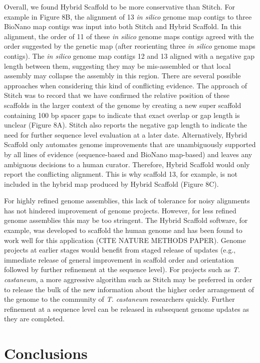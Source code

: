 \documentclass{bmcart}
\begin{document}
Overall, we found Hybrid Scaffold to be more conservative than Stitch. For example in Figure 8B, the alignment of 13 \textit{in silico} genome map contigs to three BioNano map contigs was input into both Stitch and Hybrid Scaffold. In this alignment, the order of 11 of these \textit{in silico} genome maps contigs agreed with the order suggested by the genetic map (after reorienting three \textit{in silico} genome maps contigs). The \textit{in silico} genome map contigs 12 and 13 aligned with a negative gap length between them, suggesting they may be mis-assembled or that local assembly may collapse the assembly in this region. There are several possible approaches when considering this kind of conflicting evidence. The approach of Stitch was to record that we have confirmed the relative position of these scaffolds in the larger context of the genome by creating a new super scaffold containing 100 bp spacer gaps to indicate that exact overlap or gap length is unclear (Figure 8A). Stitch also reports the negative gap length to indicate the need for further sequence level evaluation at a later date. Alternatively, Hybrid Scaffold only automates genome improvements that are unambiguously supported by all lines of evidence (sequence-based and BioNano map-based) and leaves any ambiguous decisions to a human curator. Therefore, Hybrid Scaffold would only report the conflicting alignment. This is why scaffold 13, for example, is not included in the hybrid map produced by Hybrid Scaffold (Figure 8C). 

For highly refined genome assemblies, this lack of tolerance for noisy alignments has not hindered improvement of genome projects. However, for less refined genome assemblies this may be too stringent. The Hybrid Scaffold software, for example, was developed to scaffold the human genome and has been found to work well for this application (CITE NATURE METHODS PAPER). Genome projects at earlier stages would benefit from staged release of updates (e.g., immediate release of general improvement in scaffold order and orientation followed by further refinement at the sequence level). For projects such as \textit{T. castaneum}, a more aggressive algorithm such as Stitch may be preferred in order to release the bulk of the new information about the higher order arrangement of the genome to the community of \textit{T. castaneum} researchers quickly. Further refinement at a sequence level can be released in subsequent genome updates as they are completed.

\section*{Conclusions}
\end{document}
